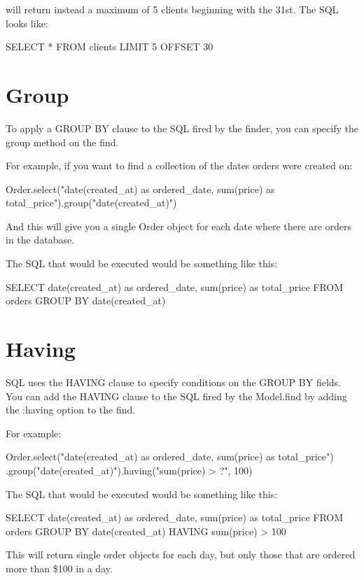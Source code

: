 \documentclass[10pt]{book}
\newenvironment{code}{%
  \scriptsize
    \verbatim
}{%
    \endverbatim
    \newline
}
\begin{document}
will return instead a maximum of 5 clients beginning with the 31st. The SQL looks like:
\begin{code}
SELECT * FROM clients LIMIT 5 OFFSET 30
\end{code}

\section{ Group}

To apply a GROUP BY clause to the SQL fired by the finder, you can specify the group method on the find.

For example, if you want to find a collection of the dates orders were created on:
\begin{code}
Order.select("date(created_at) as ordered_date,
sum(price) as total_price").group("date(created_at)")
\end{code}

And this will give you a single Order object for each date where there are orders in the database.

The SQL that would be executed would be something like this:
\begin{code}
SELECT date(created_at) as ordered_date, sum(price) as total_price 
FROM orders GROUP BY date(created_at)
\end{code}

\section{ Having}

SQL uses the HAVING clause to specify conditions on the GROUP BY fields. You can add the HAVING clause to the SQL fired by the Model.find by adding the :having option to the find.

For example:
\begin{code}
Order.select("date(created_at) as ordered_date, sum(price) as total_price")
.group("date(created_at)").having("sum(price) > ?", 100)
\end{code}

The SQL that would be executed would be something like this:
\begin{code}
SELECT date(created_at) as ordered_date, sum(price) as total_price 
FROM orders GROUP BY date(created_at) HAVING sum(price) > 100
\end{code}

This will return single order objects for each day, but only those that are ordered more than \$100 in a day.
\end{document}
